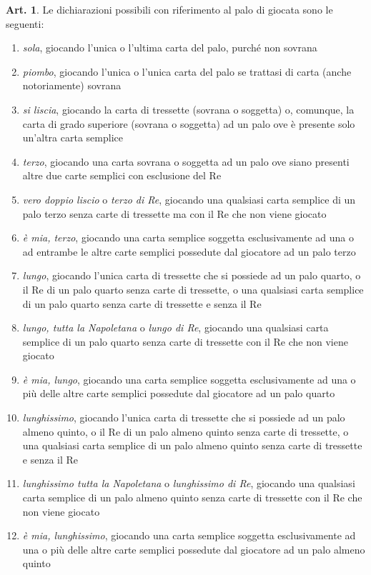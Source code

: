 \documentclass[italian,a4paper]{book}
\theoremstyle{definition}
\newtheorem{art}{Art.}
\newenvironment{packedenum}{
\begin{enumerate}
  \setlength{\itemsep}{1pt}
  \setlength{\parskip}{0pt}
  \setlength{\parsep}{0pt}
}{\end{enumerate}}
\begin{document}
\begin{art}
Le dichiarazioni possibili con riferimento al palo di giocata  sono le seguenti:
\begin{packedenum}
\item \emph{sola},  giocando l'unica o l'ultima carta del palo, purché non sovrana
\item \emph{piombo},  giocando l'unica o l'unica carta del palo se trattasi di carta (anche notoriamente) sovrana
\item \emph{si liscia},  giocando la carta di tressette (sovrana o soggetta) o, comunque, la carta di grado superiore (sovrana o soggetta) ad un palo ove è presente solo un'altra carta semplice
\item \emph{terzo},  giocando una carta sovrana o soggetta ad un palo ove siano presenti altre due carte semplici con esclusione del Re
\item \emph{vero doppio liscio} o \emph{terzo di Re},  giocando una qualsiasi carta semplice di un palo terzo senza carte di tressette ma con il Re che non viene giocato
\item \emph{è mia, terzo},  giocando una carta semplice soggetta esclusivamente ad una o ad entrambe le altre carte semplici possedute dal giocatore ad un palo terzo
\item \emph{lungo},  giocando l'unica carta di tressette che si possiede ad un palo quarto, o il Re di un palo quarto senza carte di tressette, o una qualsiasi carta semplice di un palo quarto senza carte di tressette e senza il Re
\item \emph{lungo, tutta la Napoletana} o \emph{lungo di Re},  giocando una qualsiasi carta semplice di un palo quarto senza carte di tressette con il Re che non viene giocato
\item \emph{è mia, lungo},  giocando una carta semplice soggetta esclusivamente ad una o più delle altre carte semplici possedute dal giocatore ad un palo quarto
\item \emph{lunghissimo},  giocando l'unica carta di tressette che si possiede ad un palo almeno quinto, o il Re di un palo almeno quinto senza carte di tressette, o una qualsiasi carta semplice di un palo almeno quinto senza carte di tressette e senza il Re
\item \emph{lunghissimo tutta la Napoletana} o \emph{lunghissimo di Re},  giocando una qualsiasi carta semplice di un palo almeno quinto senza carte di tressette con il Re che non viene giocato
\item \emph{è mia, lunghissimo},  giocando una carta semplice soggetta esclusivamente ad una o più delle altre carte semplici possedute dal giocatore ad un palo almeno quinto

\end{packedenum}
\end{art}
\end{document}
